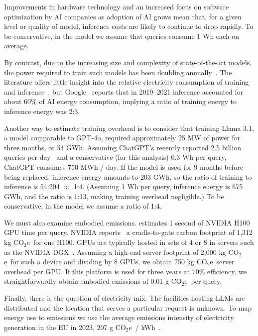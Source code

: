 \documentclass[11pt]{article}
\newcommand{\coe}{CO$_2$e}
\newcommand{\gcoe}{g \coe}
\newcommand{\kgcoe}{k\gcoe}
\newcommand{\gcoekwh}{\gcoe\ / kWh}
\begin{document}
Improvements in hardware technology and an increased focus on software optimization by AI companies as adoption of AI grows mean that, for a given level or quality of model, inference costs are likely to continue to drop rapidly. To be conservative, in the model we assume that queries consume 1 Wh each on average.

By contrast, due to the increasing size and complexity of state-of-the-art models, the power required to train such models has been doubling annually~\cite{epoch2024powerusagetrend}. The literature offers little insight into the relative electricity consumption of training and inference~\cite{verdecchia2023systematic}, but Google~\cite{patterson:footprint:2022} reports that in 2019--2021 inference accounted for about 60\% of AI energy consumption, implying a ratio of training energy to inference energy was 2:3.

Another way to estimate training overhead is to consider that training Llama 3.1, a model comparable to GPT-4o, required approximately 25 MW of power for three months, or 54 GWh. Assuming ChatGPT's recently reported 2.5 billion queries per day~\cite{techcrunch:chatgpt} and a conservative (for this analysis) 0.3 Wh per query, ChatGPT consumes 750 MWh / day. If the model is used for 9 months before being replaced, inference energy amounts to 203 GWh, so the ratio of training to inference is 54:204 $\approx$ 1:4. (Assuming 1 Wh per query, inference energy is 675 GWh, and the ratio is 1:13, making training overhead negligible.) To be conservative, in the model we assume a ratio of 1:4.

We must also examine embodied emissions. \textcite{epoch2025howmuchenergydoeschatgptuse} estimates 1 second of NVIDIA H100 GPU time per query. NVIDIA reports~\cite{nvidia:h100} a cradle-to-gate carbon footprint of 1,312 \kgcoe\ for one H100. GPUs are typically hosted in sets of 4 or 8 in servers such as the NVIDIA DGX~\cite{nvidia:dgx}. Assuming a high-end server footprint of 2,000 \kgcoe\ for such a device and dividing by 8 GPUs, we obtain 250 \kgcoe\ server overhead per GPU. If this platform is used for three years at 70\% efficiency, we straightforwardly obtain embodied emissions of 0.01 \gcoe\ per query.


Finally, there is the question of electricity mix. The facilities hosting LLMs are distributed and the location that serves a particular request is unknown. To map energy use to emissions we use the average emissions intensity of electricity generation in the EU in 2023, 207 \gcoekwh~\cite{eea:emissions:2025}.
\end{document}
